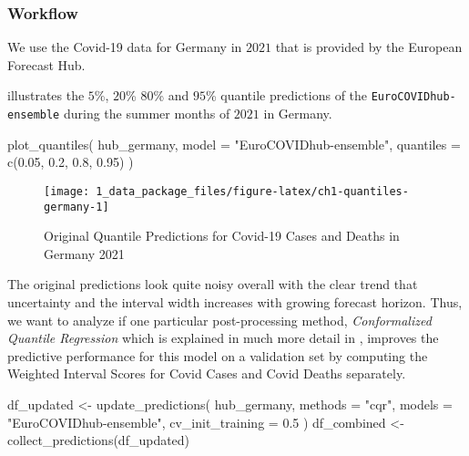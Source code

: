 \documentclass[
]{article}
\newenvironment{Shaded}{\begin{snugshade}}{\end{snugshade}}
\newcommand{\AttributeTok}[1]{\textcolor[rgb]{0.77,0.63,0.00}{#1}}
\newcommand{\FloatTok}[1]{\textcolor[rgb]{0.00,0.00,0.81}{#1}}
\newcommand{\FunctionTok}[1]{\textcolor[rgb]{0.00,0.00,0.00}{#1}}
\newcommand{\NormalTok}[1]{#1}
\newcommand{\OtherTok}[1]{\textcolor[rgb]{0.56,0.35,0.01}{#1}}
\newcommand{\StringTok}[1]{\textcolor[rgb]{0.31,0.60,0.02}{#1}}
\begin{document}
\hypertarget{workflow}{%
\subsubsection{Workflow}\label{workflow}}

We use the Covid-19 data for Germany in \(2021\) that is provided by the European Forecast Hub.

 illustrates the \(5\)\%, \(20\)\% \(80\)\% and \(95\)\% quantile predictions of the \texttt{EuroCOVIDhub-ensemble} during the summer months of \(2021\) in Germany.

\begin{Shaded}
\begin{Highlighting}[]
\FunctionTok{plot\_quantiles}\NormalTok{(}
\NormalTok{  hub\_germany,}
  \AttributeTok{model =} \StringTok{"EuroCOVIDhub{-}ensemble"}\NormalTok{, }\AttributeTok{quantiles =} \FunctionTok{c}\NormalTok{(}\FloatTok{0.05}\NormalTok{, }\FloatTok{0.2}\NormalTok{, }\FloatTok{0.8}\NormalTok{, }\FloatTok{0.95}\NormalTok{)}
\NormalTok{)}
\end{Highlighting}
\end{Shaded}

\begin{figure}

{\centering \texttt{[image: 1\_data\_package\_files/figure-latex/ch1-quantiles-germany-1]} 

}

\caption{Original Quantile Predictions for Covid-19 Cases and Deaths in Germany 2021}\label{fig:ch1-quantiles-germany}
\end{figure}

The original predictions look quite noisy overall with the clear trend that uncertainty and the interval width increases with growing forecast horizon.
Thus, we want to analyze if one particular post-processing method, \emph{Conformalized Quantile Regression} which is explained in much more detail in , improves the predictive performance for this model on a validation set by computing the Weighted Interval Scores for Covid Cases and Covid Deaths separately.

\begin{Shaded}
\begin{Highlighting}[]
\NormalTok{df\_updated }\OtherTok{\textless{}{-}} \FunctionTok{update\_predictions}\NormalTok{(}
\NormalTok{  hub\_germany,}
  \AttributeTok{methods =} \StringTok{"cqr"}\NormalTok{, }\AttributeTok{models =} \StringTok{"EuroCOVIDhub{-}ensemble"}\NormalTok{, }\AttributeTok{cv\_init\_training =} \FloatTok{0.5}
\NormalTok{)}
\NormalTok{df\_combined }\OtherTok{\textless{}{-}} \FunctionTok{collect\_predictions}\NormalTok{(df\_updated)}
\end{Highlighting}
\end{Shaded}
\end{document}
